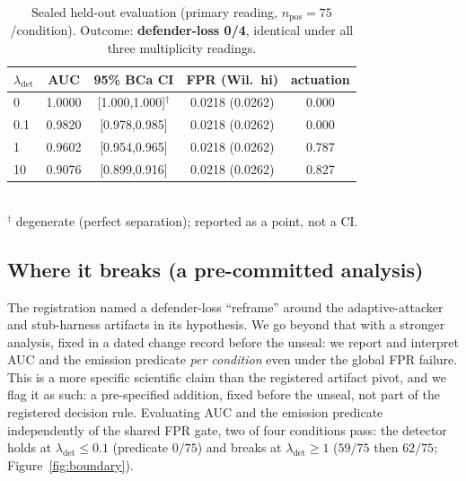 \documentclass[letterpaper,twocolumn,10pt]{article}
\newcommand{\lam}{\lambda_{\mathrm{det}}}
\begin{document}
\begin{table}[t]\centering\small
\caption{Sealed held-out evaluation (primary reading, $n_{\mathrm{pos}}=75$/condition).
Outcome: \textbf{defender-loss 0/4}, identical under all three multiplicity readings.}
\label{tab:sealed}
\begin{tabular}{@{}lcccc@{}}
\toprule
$\lam$ & AUC & 95\% BCa CI & FPR (Wil.\ hi) & actuation \\
\midrule
0    & 1.0000 & [1.000,1.000]$^\dagger$ & 0.0218 (0.0262) & 0.000 \\
0.1  & 0.9820 & [0.978,0.985] & 0.0218 (0.0262) & 0.000 \\
1    & 0.9602 & [0.954,0.965] & 0.0218 (0.0262) & 0.787 \\
10   & 0.9076 & [0.899,0.916] & 0.0218 (0.0262) & 0.827 \\
\bottomrule
\end{tabular}
\\[2pt]
{\footnotesize $^\dagger$ degenerate (perfect separation); reported as a point,
not a CI.}
\end{table}

\subsection{Where it breaks (a pre-committed analysis)}
The registration named a defender-loss ``reframe'' around the adaptive-attacker and
stub-harness artifacts in its hypothesis. We go beyond that with a stronger analysis,
fixed in a dated change record before the unseal: we report and interpret AUC and the
emission predicate \emph{per condition} even under the global FPR failure. This is a
more specific scientific claim than the registered artifact pivot, and we flag it
as such: a pre-specified addition, fixed before the unseal, not part of the
registered decision rule. Evaluating AUC
and the emission predicate independently of the shared FPR gate, two of four
conditions pass: the detector holds at $\lam \leq 0.1$ (predicate $0/75$) and breaks
at $\lam \geq 1$ ($59/75$ then $62/75$; Figure~\ref{fig:boundary}).
\end{document}
